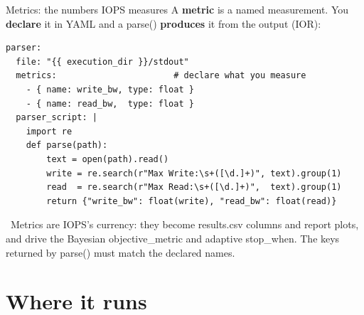 \documentclass[aspectratio=169,11pt]{beamer}
\newcommand{\code}[1]{{\ttfamily\small\color{iopsNavy}#1}}
\newcommand{\hl}[1]{{\color{iopsPink}\bfseries #1}}
\begin{document}
\begin{frame}[fragile]{Metrics: the numbers IOPS measures}
  A \hl{metric} is a named measurement. You \hl{declare} it in YAML and a
  \code{parse()} \hl{produces} it from the output (IOR):
\begin{lstlisting}[style=yaml]
parser:
  file: "{{ execution_dir }}/stdout"
  metrics:                       # declare what you measure
    - { name: write_bw, type: float }
    - { name: read_bw,  type: float }
  parser_script: |
    import re
    def parse(path):
        text = open(path).read()
        write = re.search(r"Max Write:\s+([\d.]+)", text).group(1)
        read  = re.search(r"Max Read:\s+([\d.]+)",  text).group(1)
        return {"write_bw": float(write), "read_bw": float(read)}
\end{lstlisting}
  \begin{keybox}
    \faInfoCircle~Metrics are IOPS's currency: they become \code{results.csv}
    columns and report plots, and drive the Bayesian \code{objective\_metric}
    and adaptive \code{stop\_when}. The keys returned by \code{parse()} must
    match the declared names.
  \end{keybox}
\end{frame}




\section{Where it runs}
\end{document}
